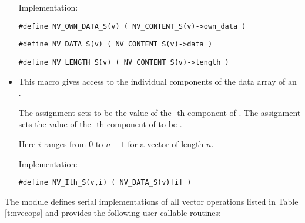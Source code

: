\begin{itemize}
  Implementation: 
  
  \verb|#define NV_OWN_DATA_S(v) ( NV_CONTENT_S(v)->own_data )|

  \verb|#define NV_DATA_S(v) ( NV_CONTENT_S(v)->data )|
  
  \verb|#define NV_LENGTH_S(v) ( NV_CONTENT_S(v)->length )|

\item {}                                               
                                                            
  This macro gives access to the individual components of the data
  array of an .

  The assignment  sets  to be the value of 
  the -th component of . The assignment    
  sets the value of the -th component of  to be .        
  
  Here $i$ ranges from $0$ to $n-1$ for a vector of length $n$.

  Implementation:

  \verb|#define NV_Ith_S(v,i) ( NV_DATA_S(v)[i] )|

\end{itemize}
The {\nvecs} module defines serial implementations of all vector operations listed 
in Table \ref{t:nvecops} and provides the following user-callable routines:

